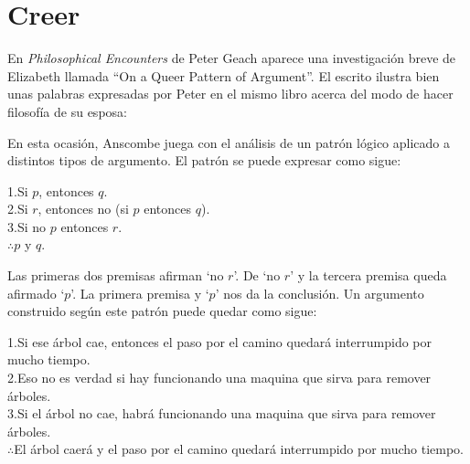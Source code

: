 \section{Creer}

En \emph{Philosophical Encounters} de Peter Geach aparece una investigación
breve de Elizabeth llamada ``On a Queer Pattern of Argument''. El escrito
ilustra bien unas palabras expresadas por Peter en el mismo libro acerca del
modo de hacer filosofía de su esposa: 

En esta ocasión, Anscombe juega con el análisis de un patrón lógico aplicado a
distintos tipos de argumento. El patrón se puede expresar como sigue:
\begin{adjustwidth}{1.2cm}{}
  1.\hspace{.5cm}Si $p$, entonces $q$.\\
  2.\hspace{.5cm}Si $r$, entonces no (si $p$ entonces $q$).\\
  3.\hspace{.5cm}Si no $p$ entonces $r$.\\
  $\therefore$\hspace{.5cm}$p$ y $q$.
\end{adjustwidth}
Las primeras dos premisas afirman `no $r$'. De `no $r$' y la tercera premisa
queda afirmado `$p$'. La primera premisa y `$p$' nos da la conclusión. Un
argumento construido según este patrón puede quedar como sigue:
\begin{adjustwidth}{1.2cm}{}
  1.\hspace{.5cm}Si ese árbol cae, entonces el paso por el camino quedará
  interrumpido por mucho tiempo.\\
  2.\hspace{.5cm}Eso no es verdad si hay funcionando una maquina que sirva para
  remover árboles.\\
  3.\hspace{.5cm}Si el árbol no cae, habrá funcionando una maquina que sirva
  para remover árboles.\\
  $\therefore$\hspace{.5cm}El árbol caerá y el paso por el camino quedará
  interrumpido por mucho tiempo.
\end{adjustwidth}

